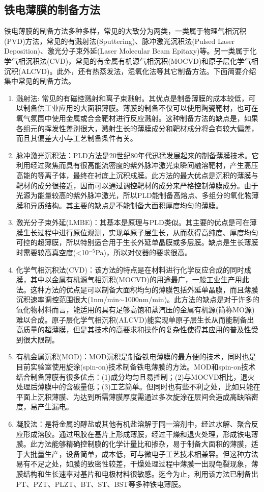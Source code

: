 \documentclass[a4paper]{article}
\begin{document}
\subsection{铁电薄膜的制备方法}
铁电薄膜的制备方法多种多样，常见的大致分为两类，一类属于物理气相沉积(PVD)方法，常见的有溅射法(Sputtering)、脉冲激光沉积法(Pulsed Laser Deposition)、激光分子束外延(Laser Molecular Beam Epitaxy)等。另一类属于化学气相沉积法(CVD)，常见的有金属有机源气相沉积(MOCVD)和原子层化学气相沉积(ALCVD)。此外，还有热蒸发法，湿氧化法等其它制备方法。下面简要介绍集中常见的制备方法。
\begin{enumerate}
    \item 溅射法: 常见的有磁控溅射和离子束溅射。其优点是制备薄膜的成本较低，可以制备供工业应用的大面积薄膜。薄膜的制备不仅可以使用陶瓷靶材，也可在氧气氛围中使用金属或合金靶材进行反应溅射。这种制备方法的缺点是，如果各组元的挥发性差别很大，溅射生长的薄膜成分和靶材成分将会有较大偏差，而且其偏差大小与工艺制备条件有关。
    \item 脉冲激光沉积法：PLD方法是20世纪80年代迅猛发展起来的制备薄膜技术。它利用经过聚焦而具有很高能流密度的紫外脉冲激光束瞬间融溶靶材，产生高压高能的等离子体，最终在衬底上沉积成膜。此方法的最大优点是沉积的薄膜与靶材的成分很接近，因而可以通过调控靶材的成分来严格控制薄膜成分。由于光源为能量较高的紫外脉冲激光，所以PLD能制备高熔点、多组分的氧化物薄膜和异质结构。其主要的缺点是不能制备大面积厚度均匀的薄膜。
    \item 激光分子束外延(LMBE)：其基本是原理与PLD类似。其主要的优点是可在薄膜生长过程中进行原位观测，实现单原子层生长，从而获得高纯度、厚度均匀可控的超薄膜，所以特别适合用于生长外延单晶膜或多层膜。缺点是生长薄膜时需要较高真空度(<10$^{-5}$Pa)，所以对仪器的要求很高。
    \item 化学气相沉积法(CVD)：该方法的特点是在材料进行化学反应合成的同时成膜，其中以金属有机源气相沉积(MOCVD)的用途最广，一般工业生产用此法。这种方法的优点是可以制备大面积均匀的薄膜包括外延单晶膜，而且薄膜沉积速率调控范围很大(1nm/min$\sim$1000nm/min)。此方法的缺点是对于许多的氧化物材料而言，能适用的具有足够高饱和蒸汽压的金属有机源(简称MO源)难以合成。原子层化学气相沉积(ALCVD)能实现单原子层生长从而能制备出高质量的超薄膜，但是其技术的高要求和操作的复杂性使得其应用的普及性受到很大限制。
    \item 有机金属沉积(MOD)：MOD沉积是制备铁电薄膜的最方便的技术，同时也是目前实验室使用旋涂(spin-on)技术制备铁电薄膜的方法。MOD和spin-on技术结合制备薄膜有很多优点：(1)成分均匀且易控制；(2)与MOCVD相比，退火处理后薄膜中的含碳量低；(3)工艺简单。但同时也有些不利之处，比如只能在平面上沉积薄膜、为达到所需薄膜厚度需通过多次旋涂在层间会造成高缺陷密度，易产生漏电。
    \item 凝胶法：是将金属的醇盐或其他有机盐溶解于同一溶剂中，经过水解、聚合反应形成溶胶。通过甩胶在基片上形成薄膜，经过干燥和退火处理，形成铁电薄膜。此方法能够精确控制膜的化学计量比和掺杂，易于制备大面积的薄膜，适于大批量生产，设备简单，成本低，可与微电子工艺技术相兼容。但这种方法易有不足之处，如膜的致密性较差，干燥处理过程中薄膜一出现龟裂现象，薄膜结构和生长速率对基片和电极材料很敏感。迄今为止，利用该方法已制备出PT、PZT、PLZT、BT、ST、BST等多种铁电薄膜。
\end{enumerate}
\end{document}
